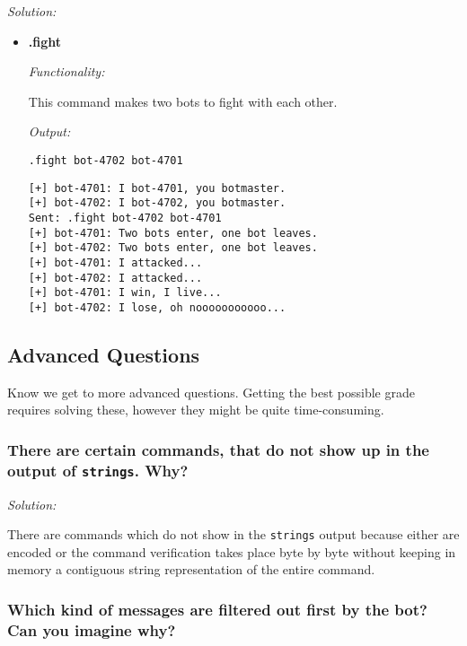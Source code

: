\documentclass[a4paper,11pt]{article}
\newenvironment{solution}%
{\par{\noindent\small\textit{Solution:}}\vspace{-12pt}\begin{framed}}%
{\end{framed}\par}
\begin{document}
\begin{solution}
\begin {itemize}
\emph{Functionality:}

This command terminates the \texttt{bot} process. 

\emph{Output:}

\verb|bot-696: One will fall, but others will rise. Hasta la vista.|

\item \textbf{.fight}

\emph{Functionality:}

This command makes two bots to fight with each other. 

\emph{Output:}

\verb|.fight bot-4702 bot-4701|

\begin{lstlisting}
[+] bot-4701: I bot-4701, you botmaster.
[+] bot-4702: I bot-4702, you botmaster.
Sent: .fight bot-4702 bot-4701
[+] bot-4701: Two bots enter, one bot leaves.
[+] bot-4702: Two bots enter, one bot leaves.
[+] bot-4701: I attacked...
[+] bot-4702: I attacked...
[+] bot-4701: I win, I live...
[+] bot-4702: I lose, oh nooooooooooo...
\end{lstlisting}

\end{itemize}

\end{solution}\fi

\subsection*{Advanced Questions}
Know we get to more advanced questions. Getting the best possible grade requires
solving these, however they might be quite time-consuming.

\subsubsection*{There are certain commands, that do not show up in the output of
\texttt{strings}. Why?}
\ifsolution
\begin{solution}
There are commands which do not show in the \texttt{strings} output because either are encoded or the command verification takes place byte by byte without keeping in memory a contiguous string representation of the entire command. %
\end{solution}\fi


\subsubsection*{Which kind of messages are filtered out first by the bot? Can
you imagine why?}
\end{document}
